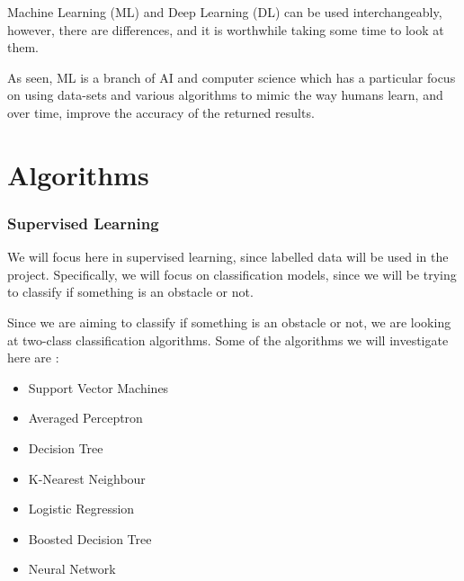 \documentclass[conference]{IEEEtran}
\begin{document}
Machine Learning (ML) and Deep Learning (DL) can be used interchangeably, however, there are differences, and it is worthwhile taking some time to look at them. 

As seen, ML is a branch of AI and computer science which has a particular focus on using data-sets and various algorithms to mimic the way humans learn, and over time, improve the accuracy of the returned results. 

\section{Algorithms}
\subsubsection{Supervised Learning}
We will focus here in supervised learning, since labelled data will be used in the project. Specifically, we will focus on classification models, since we will be trying to classify if something is an obstacle or not.

Since we are aiming to classify if something is an obstacle or not, we are looking at two-class classification algorithms. Some of the algorithms we will investigate here are \cite{azure}:


\begin{itemize}
    \item Support Vector Machines
    \item Averaged Perceptron
    \item Decision Tree
    \item K-Nearest Neighbour
    \item Logistic Regression
    \item Boosted Decision Tree
    \item Neural Network
\end{itemize}




\printbibliography
\vspace{12pt}
\end{document}
